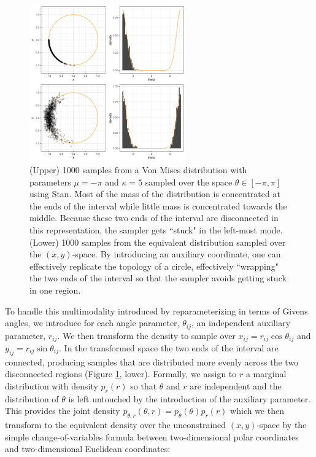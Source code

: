 \documentclass[ba]{imsart}
\numberwithin{equation}{section}
\theoremstyle{plain}
\begin{document}
\begin{figure}[h]
\centering
\vspace{.1in}
\includegraphics[width=0.6\textwidth]{figures/donut.png}
\vspace{.05in}
\caption{(Upper) 1000 samples from a Von Mises distribution with parameters $\mu = -\pi$ and $\kappa = 5$ sampled over the space $\theta \in [-\pi, \pi]$ using Stan. Most of the mass of the distribution is concentrated at the ends of the interval while little mass is concentrated towards the middle. Because these two ends of the interval are disconnected in this representation, the sampler gets ``stuck" in the left-most mode. (Lower) 1000 samples from the equivalent distribution sampled over the $(x,y)$-space. By introducing an auxiliary coordinate, one can effectively replicate the topology of a circle, effectively ``wrapping" the two ends of the interval so that the sampler avoids getting stuck in one region.}
\label{fig:donut}
\end{figure}

\noindent To handle this multimodality introduced by reparameterizing in terms of Givens angles, we introduce for each angle parameter, $\theta_{ij}$, an independent auxiliary parameter, $r_{ij}$. We then transform the density to sample over $x_{ij} = r_{ij} \cos \theta_{ij}$ and $y_{ij} = r_{ij} \sin \theta_{ij}$. In the transformed space the two ends of the interval are connected, producing samples that are distributed more evenly across the two disconnected regions (Figure \ref{fig:donut}, lower). Formally, we assign to $r$ a marginal distribution with density $p_r(r)$ so that $\theta$ and $r$ are independent and the distribution of $\theta$ is left untouched by the introduction of the auxiliary parameter. This provides the joint density $p_{\theta, r}(\theta, r) = p_\theta(\theta) p_r(r)$ which we then transform to the equivalent density over the unconstrained $(x,y)$-space by the simple change-of-variables formula between two-dimensional polar coordinates and two-dimensional Euclidean coordinates:
\end{document}
